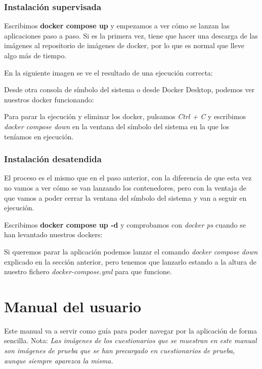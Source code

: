 \subsubsection{Instalación supervisada}

Escribimos \textbf{docker compose up} y empezamos a ver cómo se lanzan las aplicaciones paso a paso. Si es la primera vez, tiene que hacer una descarga de las imágenes al repositorio de imágenes de docker, por lo que es normal que lleve algo más de tiempo.

En la siguiente imagen se ve el resultado de una ejecución correcta:

Desde otra consola de símbolo del sistema o desde Docker Desktop, podemos ver nuestros docker funcionando:

Para parar la ejecución y eliminar los docker, pulsamos \textit{Ctrl + C} y escribimos \textit{docker compose down} en la ventana del símbolo del sistema en la que los teníamos en ejecución.

\subsubsection{Instalación desatendida}

El proceso es el mismo que en el paso anterior, con la diferencia de que esta vez no vamos a ver cómo se van lanzando los contenedores, pero con la ventaja de que vamos a poder cerrar la ventana del símbolo del sistema y van a seguir en ejecución.

Escribimos \textbf{docker compose up -d} y comprobamos con \textit{docker ps} cuando se han levantado nuestros dockers:

Si queremos parar la aplicación podemos lanzar el comando \textit{docker compose down} explicado en la sección anterior, pero tenemos que lanzarlo estando a la altura de nuestro fichero \textit{docker-compose.yml} para que funcione.

\section{Manual del usuario}

Este manual va a servir como guía para poder navegar por la aplicación de forma sencilla.
Nota: \textit{Las imágenes de los cuestionarios que se muestran en este manual son imágenes de prueba que se han precargado en cuestionarios de prueba, aunque siempre aparezca la misma.}

